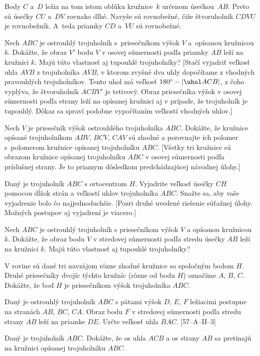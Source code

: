 {Body $C$ a~$D$ ležia na tom istom oblúku kružnice~$k$ určenom úsečkou~$AB$. Preto sú úsečky $CU$ a~$DV$ rovnako dlhé. Navyše sú rovnobežné, čiže štvoruholník $CDVU$ je rovnobežník. A~teda priamky $CD$ a~$VU$ sú rovnobežné.

Nech $ABC$ je ostrouhlý trojuholník s~priesečníkom výšok $V$ a~opísanou kružnicou $k$. Dokážte, že obraz $V'$ bodu $V$ v osovej súmernosti podľa priamky $AB$ leží na kružnici $k$. Majú túto vlastnosť aj tupouhlé trojuholníky?
[Stačí vyjadriť veľkosť uhla $AVB$ z trojuholníka $AVB$, v ktorom zvyšné dva uhly dopočítame z vhodných pravouhlých trojuholníkov. Tento uhol má veľkosť $180^\circ-|\uhol ACB|$, z čoho vyplýva, že štvoruholník $ACBV'$ je tetivový. Obraz priesečníka výšok v osovej súmernosti podľa strany leží na opísanej kružnici aj v prípade, že trojuholník je tupouhlý. Dôkaz sa spraví podobne vypočítaním veľkostí vhodných uhlov.]

Nech $V$ je priesečník výšok ostrouhlého trojuholníka $ABC$. Dokážte, že kružnice opísané trojuholníkom $ABV$, $BCV$, $CAV$ sú zhodné a porovnajte ich polomer s~polomerom kružnice opísanej trojuholníku $ABC$.
[Všetky tri kružnice sú obrazom kružnice opísanej trojuholníku $ABC$ v osovej súmernosti podľa príslušnej strany. Je to priamym dôsledkom predchádzajúcej návodnej úlohy.]

Daný je trojuholník $ABC$ s ortocentrom $H$. Vyjadrite veľkosť úsečky $CH$ pomocou dĺžok strán a veľkostí uhlov trojuholníka $ABC$. Snažte sa, aby vaše vyjadrenie bolo čo najjednoduchšie. [Pozri druhé uvedené riešenie súťažnej úlohy. Možných postupov aj vyjadrení je viacero.]

\D
Nech $ABC$ je ostrouhlý trojuholník s priesečníkom výšok $V$ a opísanou kružnicou $k$. Dokážte, že obraz bodu $V$ v stredovej súmernosti podľa stredu úsečky $AB$ leží na kružnici $k$. Majú túto vlastnosť aj tupouhlé trojuholníky?

V rovine sú dané tri navzájom rôzne zhodné kružnice so spoločným bodom $H$. Druhé priesečníky dvojíc týchto kružníc (rôzne od bodu $H$) označíme $A$, $B$, $C$. Dokážte, že bod $H$ je priesečníkom výšok trojuholníka $ABC$.

Daný je ostrouhlý trojuholník $ABC$ s pätami výšok $D$, $E$, $F$ ležiacimi postupne na stranách $AB$, $BC$, $CA$. Obraz bodu $F$ v stredovej súmernosti podľa stredu strany $AB$ leží na priamke $DE$. Určte veľkosť uhla $BAC$.
[57--A--II--3]

Daný je trojuholník $ABC$. Dokážte, že os uhla $ACB$ a os strany $AB$ sa pretínajú na kružnici opísanej trojuholníku $ABC$.

}
